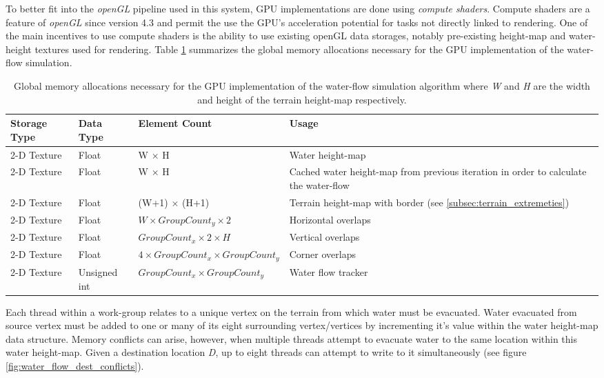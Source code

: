 To better fit into the \textit{openGL} pipeline used in this system, GPU implementations are done using \textit{compute shaders}. Compute shaders are a feature of \textit{openGL} since version 4.3 and permit the use the GPU's acceleration potential for tasks not directly linked to rendering. One of the main incentives to use compute shaders is the ability to use existing openGL data storages, notably pre-existing height-map and water-height textures used for rendering. Table \ref{tab:water_flow_simul_mem_allocs} summarizes the global memory allocations necessary for the GPU implementation of the water-flow simulation.\\

\begin{table}[]
  \centering
	    \begin{tabular}{|p{3cm}|p{1.5cm}|p{6cm}|p{5cm}|}
		\hline	
  	    \textbf{Storage Type} &  \textbf{Data Type} & \textbf{Element Count} & \textbf{Usage} \\
		\hline
		2-D Texture & Float & W $\times$ H & Water height-map\\
		\hline
		2-D Texture & Float & W $\times$ H & Cached water height-map from previous iteration in order to calculate the water-flow\\
		\hline
		2-D Texture & Float & (W+1) $\times$ (H+1) & Terrain height-map with border (see \ref{subsec:terrain_extremeties}) \\
		\hline
		2-D Texture & Float & $ W \times GroupCount_{y} \times 2 $ & Horizontal overlaps  \\
		\hline
		2-D Texture & Float & $ GroupCount_{x} \times 2 \times H $ & Vertical overlaps  \\
		\hline
		2-D Texture & Float & $ 4 \times GroupCount_{x} \times GroupCount_{y}$ & Corner overlaps  \\
		\hline
		2-D Texture & Unsigned int & $ GroupCount_{x} \times GroupCount_{y}$ & Water flow tracker \\
		\hline
		\end{tabular}
		\caption{Global memory allocations necessary for the GPU implementation of the water-flow simulation algorithm where \textit{W} and \textit{H} are the width and height of the terrain height-map respectively.}
	  \label{tab:water_flow_simul_mem_allocs}
\end{table}

Each thread within a work-group relates to a unique vertex on the terrain from which water must be evacuated. Water evacuated from source vertex must be added to one or many of its eight surrounding vertex/vertices by incrementing it's value within the water height-map data structure. Memory conflicts can arise, however, when multiple threads attempt to evacuate water to the same location within this water height-map. Given a destination location \textit{D}, up to eight threads can attempt to write to it simultaneously (see figure \ref{fig:water_flow_dest_conflicts}).\\ 

